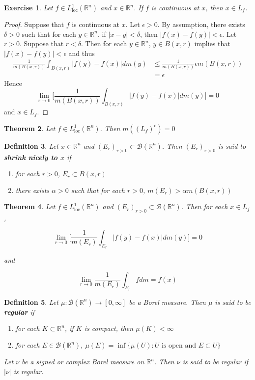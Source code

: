 \documentclass[12pt]{amsart}
\newtheorem{thm}{Theorem}[subsection]
\newtheorem{defn}[thm]{Definition}
\newtheorem{ex}[thm]{Exercise}
\newcommand{\al}{\alpha}
\newcommand{\del}{\delta}
\newcommand{\ep}{\epsilon}
\newcommand{\R}{\mathbb{R}}
\newcommand{\MB}{\mathcal{B}}
\newcommand{\RG}{[0,\infty]}
\newcommand{\Ll}{L^1_{\text{loc}}(\R^n)}
\begin{document}
	\begin{ex}
		Let $f \in \Ll$ and $x \in \R^n$. If $f$ is continuous at $x$, then $x \in L_f$.
	\end{ex}
	
	\begin{proof}
		Suppose that $f$ is continuous at $x$. Let $\ep > 0$. By assumption, there exists $\del >0$ such that for each $y \in \R^n$, if $|x-y|< \del$, then $|f(x)-f(y)| < \ep$. Let $r >0$. Suppose that $r< \del$. Then for each $y \in \R^n$, $y \in B(x,r)$ implies that $|f(x) - f(y)| < \ep$ and thus 
		\begin{align*}
			\frac{1}{m(B(x,r))}\int_{B(x,r)}|f(y) - f(x)|dm(y)
			& \leq \frac{1}{m(B(x,r))} \ep m(B(x,r))\\
			&=\ep
		\end{align*}
		Hence $$\lim_{r \rightarrow 0} \bigg[ \frac{1}{m(B(x,r))}\int_{B(x,r)}|f(y) - f(x)|dm(y)\bigg] =0$$ 
		and $x \in L_f$.
	\end{proof}
	
	\begin{thm}
		Let $f \in \Ll$. Then $m((L_f)^c) = 0$
	\end{thm}
	
	\begin{defn}
		Let $x \in \R^n$ and $(E_r)_{r>0} \subset \MB(\R^n)$. Then $(E_r)_{r>0}$ is said to \textbf{shrink nicely to $x$} if 
		
		\begin{enumerate}
			\item for each $r>0$, $E_r \subset B(x,r)$
			\item there exists $\al >0$ such that for each $r>0$, $m(E_r)> \al m(B(x,r))$
		\end{enumerate} 
	\end{defn}
	
	\begin{thm}
		Let $f \in \Ll$ and $(E_r)_{r>0} \subset \MB(\R^n)$. Then for each $x \in L_f$, 
		
		$$\lim_{r \rightarrow 0} \bigg[ \frac{1}{m(E_r)}\int_{E_r}|f(y) - f(x)|dm(y)\bigg] =0$$
		
		and 
		
		$$\lim_{r \rightarrow 0}  \frac{1}{m(E_r)}\int_{E_r}fdm = f(x)$$
	\end{thm}
	
	\begin{defn}
		Let $\mu:\MB(\R^n) \rightarrow \RG$ be a Borel measure. Then $\mu$ is said to be \textbf{regular} if 
		\begin{enumerate}
			\item for each $K \subset \R^n$, if $K$ is compact, then $\mu(K)< \infty$
			\item for each $E \in \MB(\R^n)$, $\mu(E) = \inf \{\mu(U): U \text{ is open and }E \subset U\}$
		\end{enumerate}
		
		Let $\nu$ be a signed or complex Borel measure on $\R^n$. Then $\nu$ is said to be regular if $|\nu|$ is regular.
	\end{defn}
	
\end{document}
